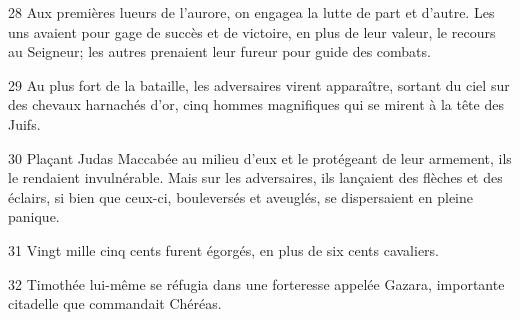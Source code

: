 
28 Aux premières lueurs de l’aurore, on engagea la lutte de part et d’autre. Les uns avaient pour gage de succès et de victoire, en plus de leur valeur, le recours au Seigneur; les autres prenaient leur fureur pour guide des combats.

29 Au plus fort de la bataille, les adversaires virent apparaître, sortant du ciel sur des chevaux harnachés d’or, cinq hommes magnifiques qui se mirent à la tête des Juifs.

30 Plaçant Judas Maccabée au milieu d’eux et le protégeant de leur armement, ils le rendaient invulnérable. Mais sur les adversaires, ils lançaient des flèches et des éclairs, si bien que ceux-ci, bouleversés et aveuglés, se dispersaient en pleine panique.

31 Vingt mille cinq cents furent égorgés, en plus de six cents cavaliers.

32 Timothée lui-même se réfugia dans une forteresse appelée Gazara, importante citadelle que commandait Chéréas.